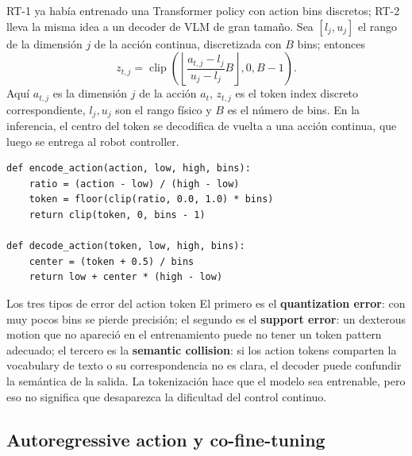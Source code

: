 RT-1 ya había entrenado una Transformer policy con action bins discretos; RT-2 lleva la misma idea a un decoder de VLM de gran tamaño. Sea $[l_j,u_j]$ el rango de la dimensión $j$ de la acción continua, discretizada con $B$ bins; entonces
$$
z_{t,j}=\operatorname{clip}\!\left(
\left\lfloor \frac{a_{t,j}-l_j}{u_j-l_j}B\right\rfloor,0,B-1
\right).
$$
Aquí $a_{t,j}$ es la dimensión $j$ de la acción $a_t$, $z_{t,j}$ es el token index discreto correspondiente, $l_j,u_j$ son el rango físico y $B$ es el número de bins. En la inferencia, el centro del token se decodifica de vuelta a una acción continua, que luego se entrega al robot controller.



\begin{lstlisting}[caption={Conversión conceptual entre acción continua y action token}]
def encode_action(action, low, high, bins):
    ratio = (action - low) / (high - low)
    token = floor(clip(ratio, 0.0, 1.0) * bins)
    return clip(token, 0, bins - 1)

def decode_action(token, low, high, bins):
    center = (token + 0.5) / bins
    return low + center * (high - low)
\end{lstlisting}

\begin{warningbox}{Los tres tipos de error del action token}
El primero es el \textbf{quantization error}: con muy pocos bins se pierde precisión; el segundo es el \textbf{support error}: un dexterous motion que no apareció en el entrenamiento puede no tener un token pattern adecuado; el tercero es la \textbf{semantic collision}: si los action tokens comparten la vocabulary de texto o su correspondencia no es clara, el decoder puede confundir la semántica de la salida. La tokenización hace que el modelo sea entrenable, pero eso no significa que desaparezca la dificultad del control continuo.
\end{warningbox}

\subsection{Autoregressive action y co-fine-tuning}

